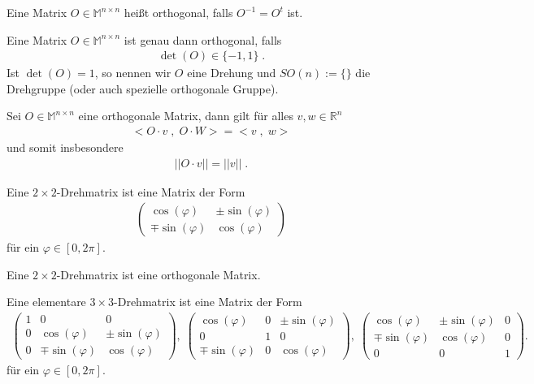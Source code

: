\begin{Definition}
Eine Matrix $O \in \mathbb{M}^{n \times n}$ heißt orthogonal, falls
$O^{-1} = O^t$ ist. 
\end{Definition}

\begin{Satz}
Eine Matrix $O \in \mathbb{M}^{n \times n}$ ist genau dann  orthogonal, falls
\begin{align*}
\det(O) \in  \{-1, 1 \} \; .
\end{align*}
Ist $\det(O) = 1$, so nennen wir $O$ eine Drehung und 
$SO(n) := \{ \}$ die Drehgruppe (oder auch spezielle orthogonale Gruppe).
\end{Satz}

\begin{Satz}
Sei $O \in \mathbb{M}^{n \times n}$ eine orthogonale Matrix, dann gilt für alles $v,w \in \mathbb{R}^n$
\begin{align*}
< O \cdot v \; , \;  O \cdot W > = <v \; , \; w>
\end{align*}
und somit insbesondere 
\begin{align*}
|| O \cdot v|| = ||v|| \; .
\end{align*}
\end{Satz}


\begin{Definition}
Eine $2 \times 2$-Drehmatrix ist eine Matrix der Form
\begin{align*}
\begin{pmatrix}
\cos(\varphi) & \pm \sin(\varphi) \\  \mp \sin(\varphi) & \cos(\varphi)
\end{pmatrix}
\end{align*}
für ein $\varphi \in [0, 2 \pi]$. 
\end{Definition}

\begin{Bemerkung}
Eine $2 \times 2$-Drehmatrix ist eine orthogonale Matrix.
\end{Bemerkung}



\begin{Definition}
Eine elementare $3 \times 3$-Drehmatrix ist eine Matrix der Form
\begin{align*}
\begin{pmatrix}
1 & 0 & 0 \\
0 & \cos(\varphi) & \pm \sin(\varphi) \\ 
 0 & \mp \sin(\varphi) & \cos(\varphi)
\end{pmatrix}, \;
\begin{pmatrix}
 \cos(\varphi) & 0 &  \pm \sin(\varphi) \\ 
0 & 1 & 0 \\ 
\mp \sin(\varphi) & 0& \cos(\varphi)
\end{pmatrix}, \;
\begin{pmatrix}
 \cos(\varphi) & \pm \sin(\varphi)  & 0\\ 
 \mp \sin(\varphi) & \cos(\varphi) & 0 \\
0 & 0 & 1 
\end{pmatrix}. 
\end{align*} 
für ein $\varphi \in [0, 2 \pi]$. 
\end{Definition}



